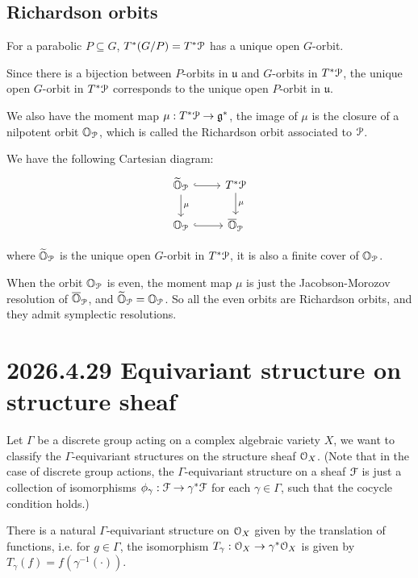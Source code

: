\documentclass[12pt]{amsart}
\numberwithin{equation}{section}
\newcommand{\fg}{\mathfrak{g}} \newcommand{\fh}{\mathfrak{h}} \newcommand{\fk}{\mathfrak{k}}
\newcommand{\fu}{\mathfrak{u}} \newcommand{\fv}{\mathfrak{v}} \newcommand{\fy}{\mathfrak{y}}
\renewcommand{\bar}{\overline}
\renewcommand{\tilde}{\widetilde}
\begin{document}
\subsection{Richardson orbits}

For a parabolic $P \subseteq G$, $T^*(G/P) = T^*{\mathcal {P}}$ has a unique open $G$-orbit.

Since there is a bijection between $P$-orbits in $\fu$ and $G$-orbits in $T^*{\mathcal {P}}$, the unique open $G$-orbit in $T^*{\mathcal {P}}$ corresponds to the unique open $P$-orbit in $\fu$.

We also have the moment map $\mu: T^*\CP \to \fg^*$, the image of $\mu$ is the closure of a nilpotent orbit ${\mathbb {O}}_{{\mathcal {P}}}$, which is called the Richardson orbit associated to ${\mathcal {P}}$.

We have the following Cartesian diagram:
\[
  \begin{tikzcd}
    \tilde{\BO}_{\CP} \arrow[r, hook] \arrow[d, "\mu"] & T^*\CP \arrow[d, "\mu"] \\
    \BO_{\CP} \arrow[r, hook] & \bar{\BO}_{\CP}
  \end{tikzcd}
\]

where $\tilde{\BO}_{\CP}$ is the unique open $G$-orbit in $T^*{\mathcal {P}}$, it is also a finite cover of ${\mathbb {O}}_{{\mathcal {P}}}$.

When the orbit ${\mathbb {O}}_{{\mathcal {P}}}$ is even, the moment map $\mu$ is just the Jacobson-Morozov resolution of $\bar{\BO}_{\CP}$, and $\tilde{\BO}_{\CP} = \BO_{\CP}$. So all the even orbits are Richardson orbits, and they admit symplectic resolutions.



\section{2026.4.29 Equivariant structure on structure sheaf}

Let $\Gamma$ be a discrete group acting on a complex algebraic variety $X$, we want to classify the $\Gamma$-equivariant structures on the structure sheaf ${\mathcal {O}}_X$. (Note that in the case of discrete group actions, the $\Gamma$-equivariant structure on a sheaf ${\mathcal {F}}$ is just a collection of isomorphisms $\phi_{\gamma}: {\mathcal {F}} \to {\gamma}^* {\mathcal {F}}$ for each $\gamma \in \Gamma$, such that the cocycle condition holds.\cite{Achar21})

\begin{lem}
  There is a natural $\Gamma$-equivariant structure on ${\mathcal {O}}_X$ given by the translation of functions, i.e. for $g \in \Gamma$, the isomorphism $T_{\gamma}:  {\mathcal {O}}_X \to {\gamma}^* {\mathcal {O}}_X$ is given by $T_{\gamma}(f) = f(\gamma^{-1}(\cdot)) $.
\end{lem}
\end{document}
